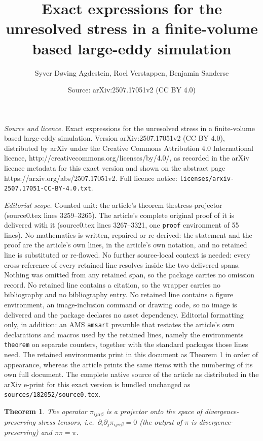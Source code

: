 \documentclass[10pt,a4paper]{amsart}
\title{Exact expressions for the unresolved stress in a finite-volume based large-eddy simulation}
\author{Syver D{\o}ving Agdestein, Roel Verstappen, Benjamin Sanderse}
\date{Source: arXiv:2507.17051v2 (CC BY 4.0)}
\newtheorem{theorem}{Theorem}
\begin{document}
\maketitle

\noindent\emph{Source and licence.} Exact expressions for the unresolved stress in a finite-volume based large-eddy simulation. Version arXiv:2507.17051v2 (CC BY 4.0), distributed by arXiv under the Creative Commons Attribution 4.0 International licence, http://creativecommons.org/licenses/by/4.0/, as recorded in the arXiv licence metadata for this exact version and shown on the abstract page https://arxiv.org/abs/2507.17051v2. Full licence notice: \texttt{licenses/arxiv-2507.17051-CC-BY-4.0.txt}.\par\smallskip

\noindent\textit{Editorial scope.} Counted unit: the article's theorem th:stress-projector (source0.tex lines 3259--3265). The article's complete original proof of it is delivered with it (source0.tex lines 3267--3321, one \texttt{proof} environment of 55 lines). No mathematics is written, repaired or re-derived: the statement and the proof are the article's own lines, in the article's own notation, and no retained line is substituted or re-flowed.  No further source-local context is needed: every cross-reference of every retained line resolves inside the two delivered spans.  Nothing was omitted from any retained span, so the package carries no omission record.  No retained line contains a citation, so the wrapper carries no bibliography and no bibliography entry.  No retained line contains a figure environment, an image-inclusion command or drawing code, so no image is delivered and the package declares no asset dependency.  Editorial formatting only, in addition: an AMS \texttt{amsart} preamble that restates the article's own declarations and macros used by the retained lines, namely the environments \texttt{theorem} on separate counters, together with the standard packages those lines need.  The retained environments print in this document as Theorem 1 in order of appearance, whereas the article prints the same items with the numbering of its own full document.  The complete native source of the article as distributed in the arXiv e-print for this exact version is bundled unchanged as \texttt{sources/182052/source0.tex}.
\begin{theorem} \label{th:stress-projector}
    The operator $\pi_{i j \alpha \beta}$ is a projector onto the space of
    divergence-preserving stress tensors, i.e.\
    $\partial_i \partial_j \pi_{i j \alpha \beta} = 0$
    (the output of $\pi$ is divergence-preserving) and
    $\pi \pi = \pi$.
\end{theorem}
\end{document}
